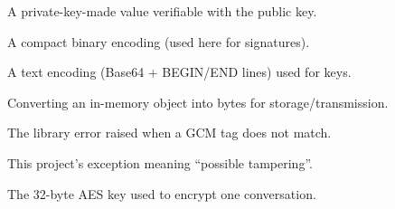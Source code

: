 \documentclass[11pt,a4paper]{report}
\begin{document}
\begin{description}[style=nextline,leftmargin=0pt]
  \item[Digital signature] A private-key-made value verifiable with the public key.
  \item[DER] A compact binary encoding (used here for signatures).
  \item[PEM] A text encoding (Base64 + BEGIN/END lines) used for keys.
  \item[Serialization] Converting an in-memory object into bytes for storage/transmission.
  \item[InvalidTag] The library error raised when a GCM tag does not match.
  \item[DecryptionError] This project's exception meaning ``possible tampering''.
  \item[Session key] The 32-byte AES key used to encrypt one conversation.
\end{description}

\end{document}
